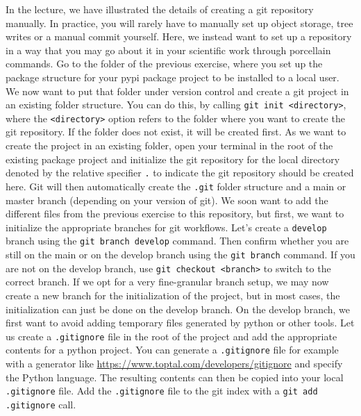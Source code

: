 \documentclass[]{erlangen-problemset}
\begin{document}
\begin{problem}[title={Setting up a git repository the simple way}]
In the lecture, we have illustrated the details of creating a git repository manually.
In practice, you will rarely have to manually set up object storage, tree writes or a manual commit yourself. 
Here, we instead want to set up a repository in a way that you may go about it in your scientific work through porcellain commands.
\noindent
\Question Go to the folder of the previous exercise, where you set up the package structure for your pypi package project to be installed to a local user. 
We now want to put that folder under version control and create a git project in an existing folder structure. 
You can do this, by calling \texttt{git init <directory>}, where the \texttt{<directory>} option refers to the folder where you want to create the git repository. 
If the folder does not exist, it will be created first. 
As we want to create the project in an existing folder, open your terminal in the root of the existing package project and initialize the git repository for the local directory denoted by the relative specifier \texttt{.} to indicate the git repository should be created here. 
Git will then automatically create the \texttt{.git} folder structure and a main or master branch (depending on your version of git).
\Question We soon want to add the different files from the previous exercise to this repository, but first, we want to initialize the appropriate branches for git workflows.
Let's create a \texttt{develop} branch using the \texttt{git branch develop} command.
Then confirm whether you are still on the main or on the develop branch using the \texttt{git branch} command. 
If you are not on the develop branch, use \texttt{git checkout <branch>} to switch to the correct branch.
If we opt for a very fine-granular branch setup, we may now create a new branch for the initialization of the project, but in most cases, the initialization can just be done on the develop branch. 
\Question On the develop branch, we first want to avoid adding temporary files generated by python or other tools. 
Let us create a \texttt{.gitignore} file in the root of the project and add the appropriate contents for a python project. 
You can generate a \texttt{.gitignore} file for example with a generator like \url{https://www.toptal.com/developers/gitignore} and specify the Python language. 
The resulting contents can then be copied into your local \texttt{.gitignore} file. 
Add the \texttt{.gitignore} file to the git index with a \texttt{git add .gitignore} call. 

\end{problem}
\end{document}
